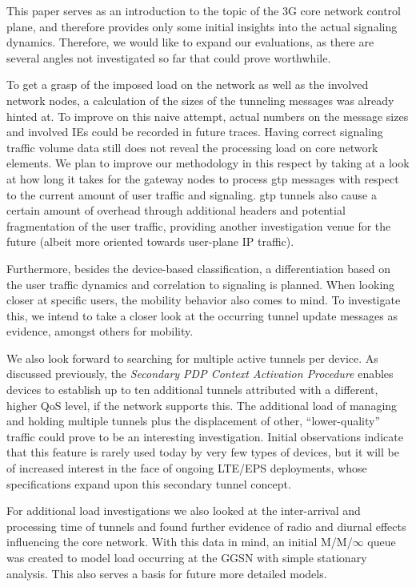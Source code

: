 This paper serves as an introduction to the topic of the 3G core network control plane, and therefore provides only some initial insights into the actual signaling dynamics. Therefore, we would like to expand our evaluations, as there are several  angles not investigated so far that could prove worthwhile.

To get a grasp of the imposed load on the network as well as the involved network nodes, a calculation of the sizes of the tunneling messages was already hinted at. To improve on this naive attempt, actual numbers on the message sizes and involved \glspl{IE} could be recorded in future traces. Having correct signaling traffic volume data still does not reveal the processing load on core network elements. We plan to improve our methodology in this respect by taking at a look at how long it takes for the gateway nodes to process \gls{gtp} messages with respect to the current amount of user traffic and signaling. \gls{gtp} tunnels also cause a certain amount of overhead through additional headers and potential fragmentation of the user traffic, providing another investigation venue for the future (albeit more oriented towards user-plane IP traffic). 

Furthermore, besides the device-based classification, a differentiation based on the user traffic dynamics and correlation to signaling is planned. When looking closer at specific users, the mobility behavior also comes to mind. To investigate this, we intend to take a closer look at the occurring tunnel update messages as evidence, amongst others for mobility.

We also look forward to searching for multiple active tunnels per device. As discussed previously, the \textit{Secondary PDP Context Activation Procedure} enables devices to establish up to ten additional tunnels attributed with a different, higher QoS level, if the network supports this. The additional load of managing and holding multiple tunnels plus the displacement of other, ``lower-quality'' traffic could prove to be an interesting investigation. Initial observations indicate that this feature is rarely used today by very few types of devices, but it will be of increased interest in the face of ongoing LTE/EPS deployments, whose specifications expand upon this secondary tunnel concept.

For additional load investigations we also looked at the inter-arrival and processing time of tunnels and found further evidence of radio and diurnal effects influencing the core network. With this data in mind, an initial M/M/$\infty$ queue was created to model load occurring at the \gls{GGSN} with simple stationary analysis. This also serves a basis for future more detailed models.

